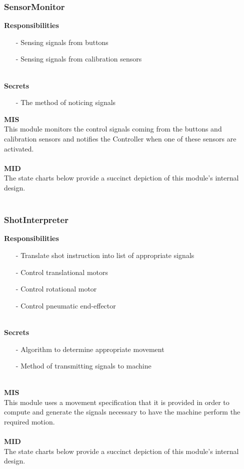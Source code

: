 \documentclass[titlepage]{article}
\begin{document}
\subsubsection{SensorMonitor}
\textbf{Responsibilities}
\begin{itemize}
	\item[-] Sensing signals from buttons
	\item[-] Sensing signals from calibration sensors
\end{itemize}~\\
\textbf{Secrets}
\begin{itemize}
	\item[-] The method of noticing signals
\end{itemize}
\newpage

\textbf{MIS}\\[2mm]
This module monitors the control signals coming from the buttons and calibration sensors and notifies the Controller when one of these sensors are activated.
\\\\
\textbf{MID}\\[2mm]
The state charts below provide a succinct depiction of this module's internal design.
\\\\
\subsubsection{ShotInterpreter}
\textbf{Responsibilities}
\begin{itemize}
	\item[-] Translate shot instruction into list of appropriate signals
	\item[-] Control translational motors
	\item[-] Control rotational motor
	\item[-] Control pneumatic end-effector
\end{itemize}~\\
\textbf{Secrets}
\begin{itemize}
	\item[-] Algorithm to determine appropriate movement
	\item[-] Method of transmitting signals to machine
\end{itemize}~\\
\textbf{MIS}\\[2mm]
This module uses a movement specification that it is provided in order to compute and generate the signals necessary to have the machine perform the required motion.
\\\\
\textbf{MID}\\[2mm]
The state charts below provide a succinct depiction of this module's internal design.
\\\\
\end{document}
